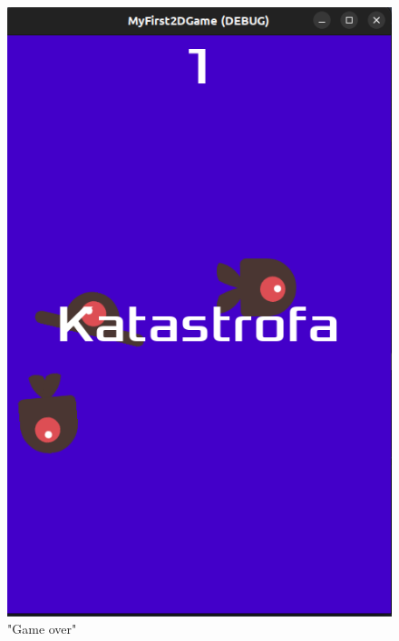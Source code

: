 \documentclass[a4paper]{article}
\begin{document}
\begin{center}
\begin{figure}
		\includegraphics[height=0.35\textheight]{game_over.png}
		\caption{"Game over"}
	\end{figure}
\end{center}
\end{document}
